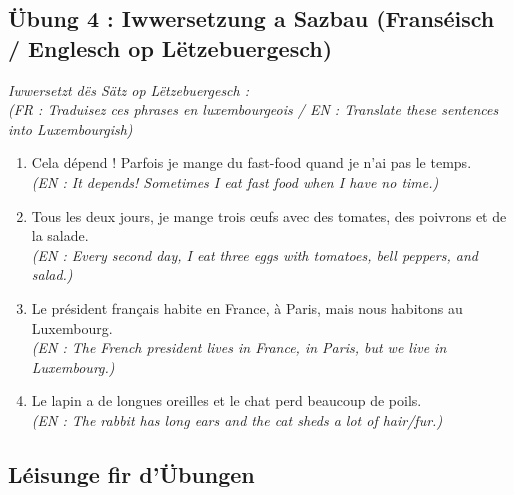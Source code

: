 \subsection*{Übung 4 : Iwwersetzung a Sazbau (Franséisch / Englesch op Lëtzebuergesch)}
\textit{Iwwersetzt dës Sätz op Lëtzebuergesch :} \\
\textit{\small(FR : Traduisez ces phrases en luxembourgeois / EN : Translate these sentences into Luxembourgish)}

\begin{enumerate}
    \item Cela dépend ! Parfois je mange du fast-food quand je n'ai pas le temps. \\
    \small\textit{(EN : It depends! Sometimes I eat fast food when I have no time.)}
    \item Tous les deux jours, je mange trois œufs avec des tomates, des poivrons et de la salade. \\
    \small\textit{(EN : Every second day, I eat three eggs with tomatoes, bell peppers, and salad.)}
    \item Le président français habite en France, à Paris, mais nous habitons au Luxembourg. \\
    \small\textit{(EN : The French president lives in France, in Paris, but we live in Luxembourg.)}
    \item Le lapin a de longues oreilles et le chat perd beaucoup de poils. \\
    \small\textit{(EN : The rabbit has long ears and the cat sheds a lot of hair/fur.)}
\end{enumerate}

\vspace{1em}

\subsection*{Léisunge fir d'Übungen}

